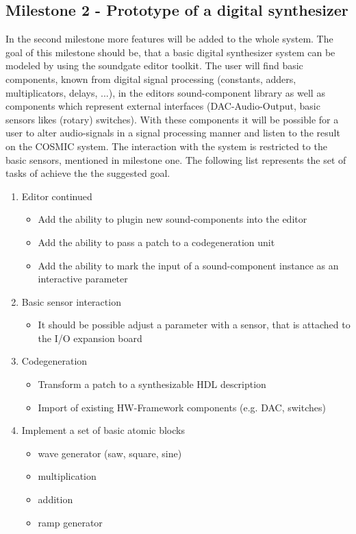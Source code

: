 \subsection{Milestone 2 - Prototype of a digital synthesizer}

In the second milestone more features will be added to the whole system. The goal of this milestone should be, that a basic digital synthesizer system can be modeled by using the soundgate editor toolkit. The user will find basic components, known from digital signal processing (constants, adders, multiplicators, delays, ...), in the editors sound-component library as well as components which represent external interfaces (DAC-Audio-Output, basic sensors likes (rotary) switches). With these components it will be possible for a user to alter audio-signals in a signal processing manner and listen to the result on the COSMIC system. The interaction with the system is restricted to the basic sensors, mentioned in milestone one. The following list represents the set of tasks of achieve the the suggested goal.

	\begin{enumerate}
		\item Editor continued
			\begin{itemize}
				\item Add the ability to plugin new sound-components into the editor
				\item Add the ability to pass a patch to a codegeneration unit
				\item Add the ability to mark the input of a sound-component instance as an interactive parameter
			\end{itemize}
		\item Basic sensor interaction
			\begin{itemize}
				\item It should be possible adjust a parameter with a sensor, that is attached to the I/O expansion board
			\end{itemize}
		\item Codegeneration	
			\begin{itemize}
				\item Transform a patch to a synthesizable HDL description
				\item Import of existing HW-Framework components (e.g. DAC, switches)
			\end{itemize}
		\item Implement a set of basic atomic blocks
			\begin{itemize}
				\item wave generator (saw, square, sine)
				\item multiplication
				\item addition
				\item ramp generator
			\end{itemize}
	\end{enumerate}


